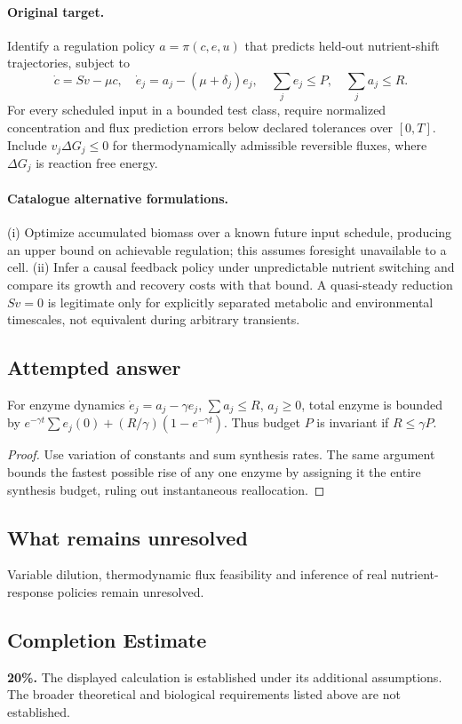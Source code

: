 \documentclass[11pt]{article}
\begin{document}
\paragraph{Original target.}
Identify a regulation policy $a=\pi(c,e,u)$ that predicts held-out nutrient-shift trajectories, subject to
\[\dot c=Sv-\mu c,\quad \dot e_j=a_j-(\mu+\delta_j)e_j,\quad \sum_j e_j\le P,\quad \sum_j a_j\le R.\]
For every scheduled input in a bounded test class, require normalized concentration and flux prediction errors below declared tolerances over $[0,T]$. Include $v_j\Delta G_j\le0$ for thermodynamically admissible reversible fluxes, where $\Delta G_j$ is reaction free energy.
\paragraph{Catalogue alternative formulations.}
(i) Optimize accumulated biomass over a known future input schedule, producing an upper bound on achievable regulation; this assumes foresight unavailable to a cell. (ii) Infer a causal feedback policy under unpredictable nutrient switching and compare its growth and recovery costs with that bound. A quasi-steady reduction $Sv=0$ is legitimate only for explicitly separated metabolic and environmental timescales, not equivalent during arbitrary transients.
\subsection{Attempted answer}
\begin{proposition}
For enzyme dynamics $\dot e_j=a_j-\gamma e_j$, $\sum a_j\leq R$, $a_j\geq0$, total enzyme is bounded by $e^{-\gamma t}\sum e_j(0)+(R/\gamma)(1-e^{-\gamma t})$. Thus budget $P$ is invariant if $R\leq\gamma P$.
\end{proposition}
\begin{proof}
Use variation of constants and sum synthesis rates. The same argument bounds the fastest possible rise of any one enzyme by assigning it the entire synthesis budget, ruling out instantaneous reallocation.
\end{proof}
\subsection{What remains unresolved}
Variable dilution, thermodynamic flux feasibility and inference of real nutrient-response policies remain unresolved.
\subsection{Completion Estimate}
\textbf{20\%.} The displayed calculation is established under its additional assumptions. The broader theoretical and biological requirements listed above are not established.
\end{document}
